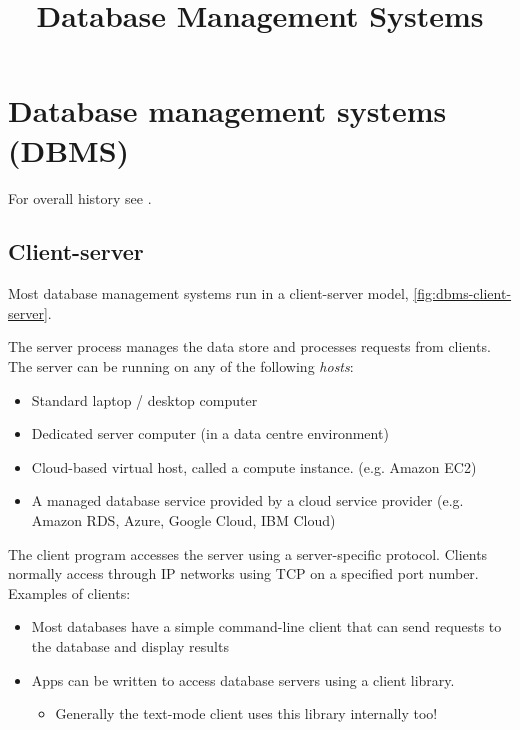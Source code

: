 \documentclass{pgnotes}
\title{Database Management Systems}
\begin{document}
\maketitle

\section{Database management systems (DBMS)}
\label{sec:dbms}

For overall history see \citep{grad:2009:history}. 

\subsection{Client-server}

Most database management systems run in a client-server model, \autoref{fig:dbms-client-server}.


The server process manages the data store and processes requests from clients.
The server can be running on any of the following \textit{hosts}:
\begin{itemize}
\item Standard laptop / desktop computer
\item Dedicated server computer (in a data centre environment)
\item Cloud-based virtual host, called a compute instance. (e.g. Amazon EC2) 
\item A managed database service provided by a cloud service provider (e.g. Amazon RDS, Azure, Google Cloud, IBM Cloud)
\end{itemize}

The client program accesses the server using a server-specific protocol.
Clients normally access through IP networks using TCP on a specified port number.
Examples of clients:
\begin{itemize}
\item Most databases have a simple command-line client that can send requests to the database and display results
\item Apps can be written to access database servers using a client library.
  \begin{itemize}
  \item Generally the text-mode client uses this library internally too! 
  \end{itemize}
\end{itemize}
\end{document}
